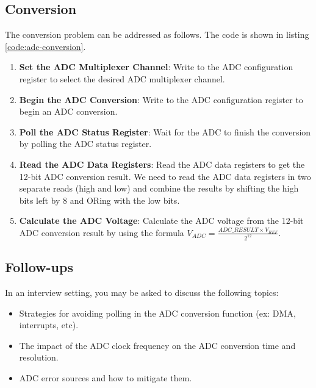 \documentclass[main.tex]{subfiles}
\begin{document}


\subsection{Conversion}
The conversion problem can be addressed as follows. The code is shown in listing \ref{code:adc-conversion}.
\begin{enumerate}
    \item \textbf{Set the ADC Multiplexer Channel}: Write to the ADC configuration register to select the desired ADC multiplexer channel.
    \item \textbf{Begin the ADC Conversion}: Write to the ADC configuration register to begin an ADC conversion.
    \item \textbf{Poll the ADC Status Register}: Wait for the ADC to finish the conversion by polling the ADC status register.
    \item \textbf{Read the ADC Data Registers}: Read the ADC data registers to get the 12-bit ADC conversion result. We need to read the ADC data registers in two separate reads (high and low) and combine the results by shifting the high bits left by 8 and ORing with the low bits.
    \item \textbf{Calculate the ADC Voltage}: Calculate the ADC voltage from the 12-bit ADC conversion result by using the formula $V_{ADC} = \frac{ADC\_RESULT \times V_{REF}}{2^{12}}$.
\end{enumerate}



\subsection{Follow-ups}
In an interview setting, you may be asked to discuss the following topics:
\begin{itemize}
    \item Strategies for avoiding polling in the ADC conversion function (ex: DMA, interrupts, etc).
    \item The impact of the ADC clock frequency on the ADC conversion time and resolution.
    \item ADC error sources and how to mitigate them.
\end{itemize}
\end{document}
